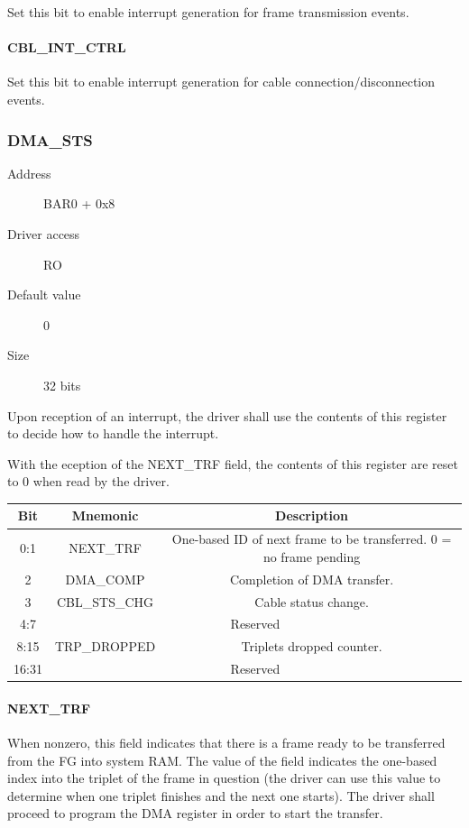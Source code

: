 \documentclass[12pt]{article}
\begin{document}
Set this bit to enable interrupt generation for frame transmission events. 

\paragraph{CBL\_INT\_CTRL}

Set this bit to enable interrupt generation for cable connection/disconnection events.

\subsubsection{DMA\_STS}

\begin{description}
\item[Address] BAR0 + 0x8
\item[Driver access] RO
\item[Default value] 0
\item[Size] 32 bits
\end{description}

Upon reception of an interrupt, the driver shall use the contents of this register to decide how to handle the interrupt.

With the eception of the NEXT\_TRF field, the contents of this register are reset to 0 when read by the driver.

\begin{tabular}{|c|c|c|} \hline
\textbf{Bit} & \textbf{Mnemonic} & \textbf{Description} \\ \hline
0:1 & NEXT\_TRF & One-based ID of next frame to be transferred. 0 = no frame pending \\ \hline
2 & DMA\_COMP & Completion of DMA transfer. \\ \hline
3 & CBL\_STS\_CHG & Cable status change. \\ \hline
4:7 & \multicolumn{2}{|c|}{Reserved} \\ \hline
8:15 & TRP\_DROPPED & Triplets dropped counter. \\ \hline
16:31 & \multicolumn{2}{|c|}{Reserved} \\ \hline
\end{tabular}

\paragraph{NEXT\_TRF}

When nonzero, this field indicates that there is a frame ready to be transferred from the FG into system RAM. The value of the field indicates the one-based index into the triplet of the frame in question (the driver can use this value to determine when one triplet finishes and the next one starts). The driver shall proceed to program the DMA register in order to start the transfer.
\end{document}
